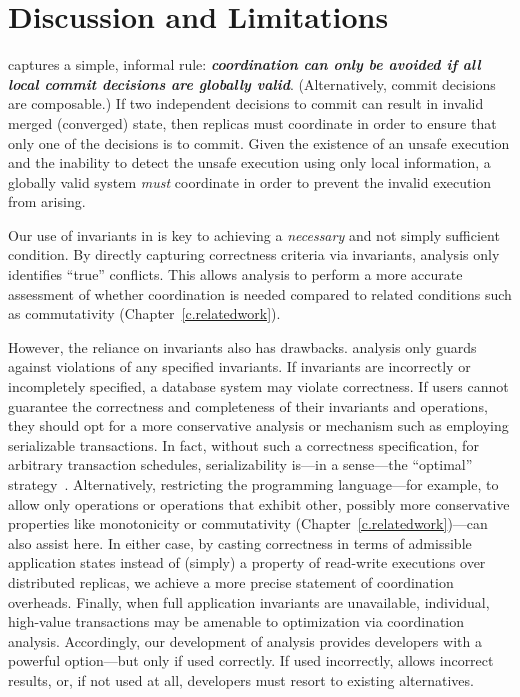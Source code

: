 \section{Discussion and Limitations}
\label{sec:theory-discussion}

\IConfluence captures a simple, informal rule:
\textbf{\textit{coordination can only be avoided if all local commit
    decisions are globally valid}}. (Alternatively, commit decisions
are composable.) If two independent decisions to commit can result in
invalid merged (converged) state, then replicas must coordinate in
order to ensure that only one of the decisions is to commit. Given the
existence of an unsafe execution and the inability to detect the
unsafe execution using only local information, a globally valid system
\textit{must} coordinate in order to prevent the invalid execution
from arising.

 Our use of invariants in \iconfluence is
key to achieving a \textit{necessary} and not simply sufficient
condition. By directly capturing correctness criteria via invariants,
\iconfluence analysis only identifies ``true'' conflicts. This allows
\iconfluence analysis to perform a more accurate assessment of whether
coordination is needed compared to related conditions such as
commutativity (Chapter~\ref{c.relatedwork}).

However, the reliance on invariants also has drawbacks. \Iconfluence
analysis only guards against violations of any specified
invariants. If invariants are incorrectly or incompletely specified, a
\iconfluent database system may violate correctness. If users cannot
guarantee the correctness and completeness of their invariants and
operations, they should opt for a more conservative analysis or
mechanism such as employing serializable transactions. In fact,
without such a correctness specification, for arbitrary transaction
schedules, serializability is---in a sense---the ``optimal''
strategy~\cite{kung1979optimality}. Alternatively, restricting the
programming language---for example, to allow only \iconfluent
operations or operations that exhibit other, possibly more
conservative properties like monotonicity or commutativity
(Chapter~\ref{c.relatedwork})---can also assist here. In either case,
by casting correctness in terms of admissible application states
instead of (simply) a property of read-write executions over
distributed replicas, we achieve a more precise statement of
coordination overheads. Finally, when full application invariants are
unavailable, individual, high-value transactions may be amenable to
optimization via \iconfluence coordination analysis. Accordingly, our
development of \iconfluence analysis provides developers with a
powerful option---but only if used correctly. If used incorrectly,
\iconfluence allows incorrect results, or, if not used at all,
developers must resort to existing alternatives.

